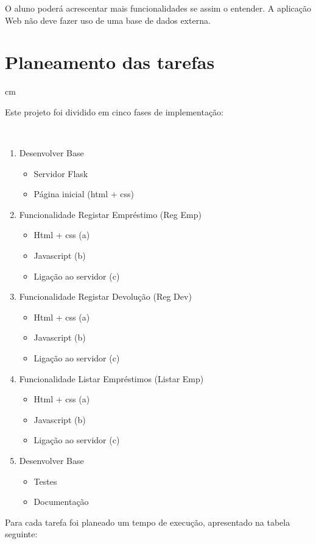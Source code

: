 \documentclass[12pt, a4paper, twoside]{article}
\begin{document}
O aluno poderá acrescentar mais funcionalidades se assim o entender. A aplicação Web não deve fazer uso de uma base de dados externa.

\newpage
\section{Planeamento das tarefas}
 cm

Este projeto foi dividido em cinco fases de implementação:

\\
\begin{enumerate}
	\item Desenvolver Base
  	\begin{itemize}
		\item Servidor Flask
  		\item Página inicial (html + css)
  	\end{itemize}
  	\item Funcionalidade Registar Empréstimo (Reg Emp)
  	\begin{itemize}
  		\item Html + css (a)
  		\item Javascript (b)
  		\item Ligação ao servidor (c)
	\end{itemize}
	\item Funcionalidade Registar Devolução (Reg Dev)
  	\begin{itemize}
  		\item Html + css (a)
  		\item Javascript (b)
  		\item Ligação ao servidor (c)
	\end{itemize}
	\item Funcionalidade Listar Empréstimos (Listar Emp)
  	\begin{itemize}
  		\item Html + css (a)
  		\item Javascript (b)
  		\item Ligação ao servidor (c)
	\end{itemize}
	\item Desenvolver Base
  	\begin{itemize}
  		\item Testes
  		\item Documentação
	\end{itemize}
\end{enumerate}

\newpage
Para cada tarefa foi planeado um tempo de execução, apresentado na tabela seguinte:
\end{document}
